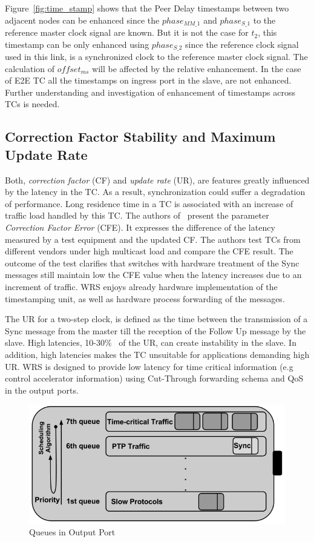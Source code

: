 Figure~\ref{fig:time_stamp} shows that the Peer Delay timestamps between two 
adjacent nodes can be enhanced since the $phase_{MM\_1}$ and $phase_{S\_1}$ to
the reference master clock signal are known. But it is not the case for $t_{2}$, 
this timestamp can be only enhanced using $phase_{S\_2}$ since the reference clock 
signal used in this link, is a synchronized clock to the reference master clock
signal. The calculation of $offset_{ms}$ will be affected by the relative
enhancement. In the case of E2E TC all the timestamps on ingress port in the slave, are
not enhanced. Further understanding and investigation of enhancement of 
timestamps across TCs is needed.


\subsection{Correction Factor Stability and Maximum Update Rate}

Both, \textit{correction factor} (CF) and  \textit{update rate} (UR), are features greatly influenced
by the latency in the TC. As a result, synchronization could suffer
a degradation of performance. Long residence time in a TC is associated 
with an increase of traffic load handled by this TC. The authors of~\cite{biblio:tc_perf} 
present the parameter \textit{Correction Factor Error} (CFE). It expresses the difference of the latency measured by a 
test equipment and the updated CF. The authors test TCs from different vendors
under high multicast load and compare the CFE result. 
The outcome of the test clarifies that switches with hardware treatment of the Sync messages 
still maintain low the CFE value when the latency increases due to an increment
of traffic. WRS enjoys already hardware implementation 
of the timestamping unit, as well as hardware process forwarding of the messages.

The UR for a two-step clock, is defined as the time between the transmission of a Sync
message from the master till the reception of the Follow Up message by the slave. 
High latencies, 10-30\%~\cite{biblio:tc_perf} of the UR, can create 
instability in the slave. In addition, high latencies makes the TC unsuitable for applications
demanding high UR. WRS is designed to provide low latency for time critical
information (e.g control accelerator information) using Cut-Through forwarding
schema and QoS~\cite{biblio:vlan} in the output ports. 

\begin{figure}[!t]
\centering
\includegraphics[scale=0.35]{fig/wr_port.png}
\caption{Queues in Output Port}
\label{fig:queue}
\end{figure}


